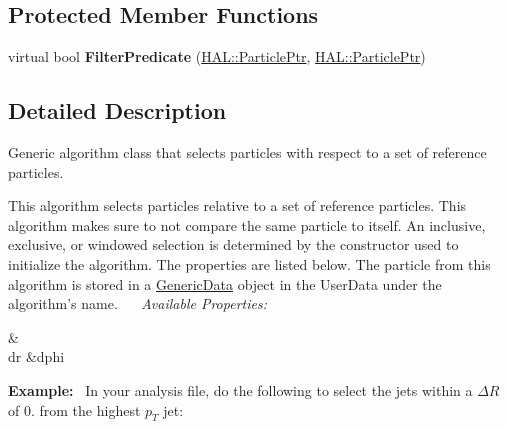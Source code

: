 \subsection*{Protected Member Functions}
\begin{DoxyCompactItemize}
\item 
\hypertarget{class_h_a_l_1_1_algorithms_1_1_select_ref_particle_a04fa4b96a01e34c5ee0bb8782eb51b00}{virtual bool {\bfseries Filter\+Predicate} (\hyperlink{class_h_a_l_1_1_generic_particle}{H\+A\+L\+::\+Particle\+Ptr}, \hyperlink{class_h_a_l_1_1_generic_particle}{H\+A\+L\+::\+Particle\+Ptr})}\label{class_h_a_l_1_1_algorithms_1_1_select_ref_particle_a04fa4b96a01e34c5ee0bb8782eb51b00}

\end{DoxyCompactItemize}


\subsection{Detailed Description}
Generic algorithm class that selects particles with respect to a set of reference particles. 

This algorithm selects particles relative to a set of reference particles. This algorithm makes sure to not compare the same particle to itself. An inclusive, exclusive, or windowed selection is determined by the constructor used to initialize the algorithm. The properties are listed below. The particle from this algorithm is stored in a \hyperlink{class_h_a_l_1_1_generic_data}{Generic\+Data} object in the User\+Data under the algorithm's name.~\newline
~\newline
{\itshape Available Properties\+:} \begin{TabularC}{2}
\hline
{}\PBS{}&\PBS\centering {\bf $ \Delta\phi $  }\\
\PBS\centering dr &\PBS\centering dphi \\
\end{TabularC}
{\bfseries Example\+:}~\newline
In your analysis file, do the following to select the jets within a $ \Delta R $ of 0. from the highest $ p_T $ jet\+:


